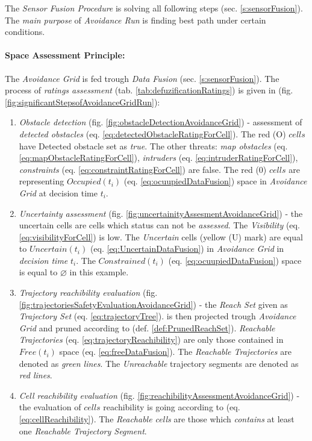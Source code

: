 \begin{note}
    The \emph{Sensor Fusion Procedure} is solving all following steps (sec. \ref{s:sensorFusion}). The \emph{main purpose} of \emph{Avoidance Run} is finding best path under certain conditions.
\end{note}

\paragraph{Space Assessment Principle:} The \emph{Avoidance Grid} is fed trough \emph{Data Fusion} (sec. \ref{s:sensorFusion}). The process of \emph{ratings assessment} (tab. \ref{tab:defuzificationRatings}) is given in (fig. \ref{fig:significantStepsofAvoidanceGridRun}):
\begin{enumerate}
    \item \emph{Obstacle detection} (fig. \ref{fig:obstacleDetectionAvoidanceGrid}) - assessment of \emph{detected obstacles} (eq. \ref{eq:detectedObstacleRatingForCell}). The red (O) $cells$ have Detected obstacle set as \emph{true}. The other threats: \emph{map obstacles} (eq. \ref{eq:mapObstacleRatingForCell}), \emph{intruders} (eq. \ref{eq:intruderRatingForCell}), \emph{constraints} (eq. \ref{eq:constraintRatingForCell}) are false. The red (0) $cells$ are representing $Occupied(t_i)$ (eq. \ref{eq:ocuupiedDataFusion}) space in \emph{Avoidance Grid} at decision time $t_i$.
    
    \item \emph{Uncertainty assessment} (fig. \ref{fig:uncertainityAssesmentAvoidanceGrid}) - the uncertain cells are cells which status can not be \emph{assessed}. The \emph{Visibility} (eq. \ref{eq:visibilityForCell}) is low. The \emph{Uncertain} cells (yellow (U) mark) are equal to $Uncertain(t_i)$ (eq. \ref{eq:UncertainDataFusion}) in \emph{Avoidance Grid} in \emph{decision time} $t_i$. The $Constrained(t_i)$ (eq. \ref{eq:ocuupiedDataFusion}) space is equal to $\varnothing$ in this example.
    
    \item \emph{Trajectory reachibility evaluation} (fig. \ref{fig:trajectoriesSafetyEvaluationAvoidanceGrid}) - the \emph{Reach Set} given as \emph{Trajectory Set} (eq. \ref{eq:trajectoryTree}). is then projected trough \emph{Avoidance Grid} and pruned according to (def. \ref{def:PrunedReachSet}). \emph{Reachable Trajectories} (eq. \ref{eq:trajectoryReachibility}) are only those contained in $Free(t_i)$ space (eq. \ref{eq:freeDataFusion}). The \emph{Reachable Trajectories} are denoted as \emph{green lines}. The \emph{Unreachable} trajectory segments are denoted as \emph{red lines}. 
    
    \item \emph{Cell reachibility evaluation} (fig. \ref{fig:reachibilityAssessmentAvoidanceGrid}) - the evaluation of $cells$ reachibility is going according to (eq. \ref{eq:cellReachibility}). The \emph{Reachable cells} are those which \emph{contains} at least one \emph{Reachable Trajectory Segment}.
\end{enumerate}




